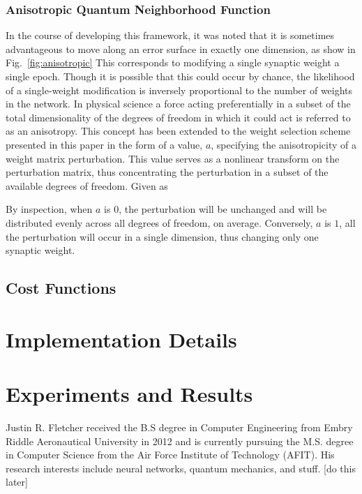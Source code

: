 \documentclass[10pt,journal,cspaper,compsoc]{IEEEtran}
\begin{document}
\subsubsection{Anisotropic Quantum Neighborhood Function}
\label{scn:anisotropic_quantum_neighborhood}
In the course of developing this framework, it was noted that it is sometimes advantageous to move along an error surface in exactly one dimension, as show in Fig.~\ref{fig:anisotropic} This corresponds to modifying a single synaptic weight a single epoch. Though it is possible that this could occur by chance, the likelihood of a single-weight modification is inversely proportional to the number of weights in the network. In physical science a force acting preferentially in a subset of the total dimensionality of the degrees of freedom in which it could act is referred to as an anisotropy. This concept has been extended to the weight selection scheme presented in this paper in the form of a value, $a$, specifying the anisotropicity of a weight matrix perturbation. This value serves as a nonlinear transform on the perturbation matrix, thus concentrating the perturbation in a subset of the available degrees of freedom. Given as 

By inspection, when $a$ is $0$, the perturbation will be unchanged and will be distributed evenly across all degrees of freedom, on average. Conversely, $a$ is $1$, all the perturbation will occur in a single dimension, thus changing only one synaptic weight.

\subsection{Cost Functions}
\label{scn:cost_functions}

\section{Implementation Details}
\label{scn:implementation_details}


\section{Experiments and Results}
\label{scn:experiments_results}





\begin{IEEEbiography} {Justin R. Fletcher} %
received the B.S degree in Computer Engineering from Embry Riddle Aeronautical University in 2012 and is currently pursuing the M.S. degree in Computer Science from the Air Force Institute of Technology (AFIT). His research interests include neural networks, quantum mechanics, and stuff. [do this later]
\end{IEEEbiography}
\end{document}
